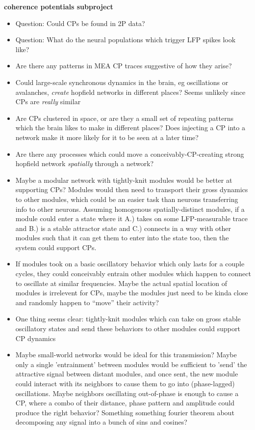 \documentclass[a4paper, 12pt]{article}
\begin{document}
\textbf{coherence potentials subproject}
\begin{itemize}
\item Question: Could CPs be found in 2P data?
\item Question: What do the neural populations which trigger LFP spikes look like?
\item Are there any patterns in MEA CP traces suggestive of how they arise?
\item Could large-scale synchronous dynamics in the brain, eg oscillations or avalanches, \textit{create} hopfield networks in different places? Seems unlikely since CPs are \textit{really} similar
\item Are CPs clustered in space, or are they a small set of repeating patterns which the brain likes to make in different places? Does injecting a CP into a network make it more likely for it to be seen at a later time?
\item Are there any processes which could move a conceivably-CP-creating strong hopfield network \textit{spatially} through a network?
\item Maybe a modular network with tightly-knit modules would be better at supporting CPs? Modules would then need to transport their gross dynamics to other modules, which could be an easier task than neurons transferring info to other neurons. Assuming homogenous spatially-distinct modules, if a module could enter a state where it A.) takes on some LFP-measurable trace and B.) is a stable attractor state and C.) connects in a way with other modules such that it can get them to enter into the state too, then the system could support CPs.
\item If modules took on a basic oscillatory behavior which only lasts for a couple cycles, they could conceivably entrain other modules which happen to connect to oscillate at similar frequencies. Maybe the actual spatial location of modules is irrelevent for CPs, maybe the modules just need to be kinda close and randomly happen to ``move'' their activity?
\item One thing seems clear: tightly-knit modules which can take on gross stable oscillatory states and send these behaviors to other modules could support CP dynamics
\item Maybe small-world networks would be ideal for this transmission? Maybe only a single 'entrainment' between modules would be sufficient to 'send' the attractive signal between distant modules, and once sent, the new module could interact with its neighbors to cause them to go into (phase-lagged) oscillations. Maybe neighbors oscillating out-of-phase is enough to cause a CP, where a combo of their distance, phase pattern and amplitude could produce the right behavior? Something something fourier theorem about decomposing any signal into a bunch of sins and cosines?

\end{itemize}
\end{document}
